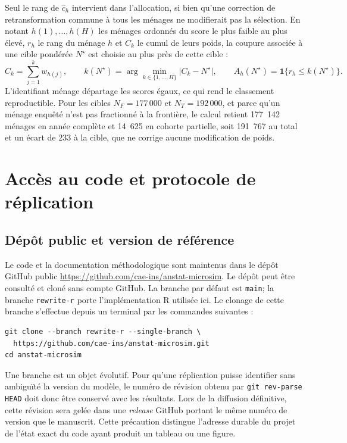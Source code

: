 \documentclass[11pt,a4paper]{article}
\begin{document}
Seul le rang de $\widehat c_h$ intervient dans l'allocation, si bien qu'une
correction de retransformation commune à tous les ménages ne modifierait pas la
sélection. En notant $h(1),\ldots,h(H)$ les ménages ordonnés du score le plus
faible au plus élevé, $r_h$ le rang du ménage $h$ et $C_k$ le cumul de leurs
poids, la coupure associée à une cible pondérée $N^\star$ est choisie au plus
près de cette cible :
\begin{equation}
C_k=\sum_{j=1}^{k}w_{h(j)},\qquad
k(N^\star)=\arg\min_{k\in\{1,\ldots,H\}}\lvert C_k-N^\star\rvert,
\qquad
A_h(N^\star)=\mathbf{1}\{r_h\leq k(N^\star)\}.
\label{eq:pmt-cutoff}
\end{equation}
L'identifiant ménage départage les scores égaux, ce qui rend le classement
reproductible. Pour les cibles $N_F=177\,000$ et $N_T=192\,000$, et parce qu'un
ménage enquêté n'est pas fractionné à la frontière, le calcul retient 177~142
ménages en année complète et 14~625 en cohorte partielle, soit 191~767 au total
et un écart de 233 à la cible, que ne corrige aucune modification de poids.

\section{Accès au code et protocole de réplication}
\label{annexe:pipeline}

\subsection{Dépôt public et version de référence}

Le code et la documentation méthodologique sont maintenus dans le dépôt GitHub
public \url{https://github.com/cae-ins/anstat-microsim}. Le dépôt peut être
consulté et cloné sans compte GitHub. La branche par défaut est
\texttt{main}; la branche \texttt{rewrite-r} porte l'implémentation R utilisée
ici. Le clonage de cette branche s'effectue depuis un terminal par
les commandes suivantes :

\begin{verbatim}
git clone --branch rewrite-r --single-branch \
  https://github.com/cae-ins/anstat-microsim.git
cd anstat-microsim
\end{verbatim}

Une branche est un objet évolutif. Pour qu'une réplication puisse identifier
sans ambiguïté la version du modèle, le numéro de révision obtenu par
\texttt{git rev-parse HEAD} doit donc être conservé avec les résultats. Lors de
la diffusion définitive, cette révision sera gelée dans une
\emph{release} GitHub portant le même numéro de version que le manuscrit. Cette
précaution distingue l'adresse durable du projet de l'état exact du code ayant
produit un tableau ou une figure.
\end{document}

